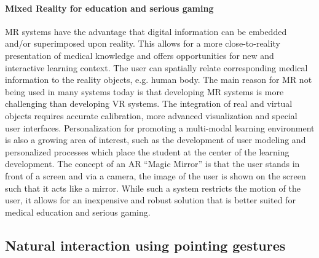\paragraph{Mixed Reality for education and serious gaming}
MR systems have the advantage that digital information can be embedded and/or superimposed upon reality. This allows for a more close-to-reality presentation of medical knowledge and offers opportunities for new and interactive learning context. 
The user can spatially relate corresponding medical information to the reality objects, e.g. human body. 
The main reason for MR not being used in many systems today is that developing MR systems is more challenging than developing VR systems. The integration of real and virtual objects requires accurate calibration, more advanced visualization and special user interfaces.
Personalization for promoting a multi-modal learning environment is also a growing area of interest, such as the development of user modeling and personalized processes which place the student at the center of the learning development.
The concept of an AR ``Magic Mirror'' is that the user stands in front of a screen and via a camera, the image of the user is shown on the screen such that it acts like a mirror. While such a system restricts the motion of the user, it allows for an inexpensive and robust solution that is better suited for medical education and serious gaming.  

\subsection{Natural interaction using pointing gestures}
